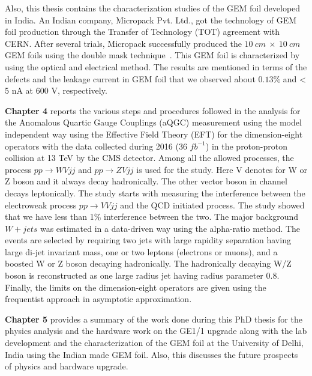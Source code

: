Also, this thesis contains the characterization studies of the GEM foil developed in India. An Indian company, Micropack Pvt. Ltd., got the technology of GEM foil production through the Transfer of Technology (TOT) agreement with CERN. After several trials, Micropack successfully produced the $10~cm~\times~10~cm$ GEM foils using the double mask technique~\cite{DEOLIVEIRA2009}. This GEM foil is characterized by using the optical and electrical method. The results are mentioned in terms of the defects and the leakage current in GEM foil that we observed about $0.13\%$ and < 5 nA at 600 V, respectively.


\textbf{Chapter 4} reports the various steps and procedures followed in the analysis for the Anomalous Quartic Gauge Couplings (aQGC) measurement using the model independent way using the Effective Field Theory (EFT) for the dimension-eight operators with the data collected during 2016 (36 $fb^{-1}$) in the proton-proton collision at 13 TeV by the CMS detector. Among all the allowed processes, the process $pp \rightarrow WV jj$ and $pp \rightarrow ZV jj$ is used for the study. Here V denotes for W or Z boson and it always decay hadronically. The other vector boson in channel decays leptonically. The study starts with measuring the interference between the electroweak process $pp \rightarrow VV jj$ and the QCD initiated process. The study showed that we have less than 1\% interference between the two. The major background $W+jets$ was estimated in a data-driven way using the alpha-ratio method. The events are selected by requiring two jets with large rapidity separation having large di-jet invariant mass, one or two leptons (electrons or muons), and a boosted W or Z boson decaying hadronically. The hadronically decaying W/Z boson is reconstructed as one large radius jet having radius parameter 0.8. Finally, the limits on the dimension-eight operators are given using the frequentist approach in asymptotic approximation.


\textbf{Chapter 5} provides a summary of the work done during this PhD thesis for the physics analysis and the hardware work on the GE1/1 upgrade along with the lab development and the characterization of the GEM foil at the University of Delhi, India using the Indian made GEM foil. Also, this discusses the future prospects of physics and hardware upgrade.


